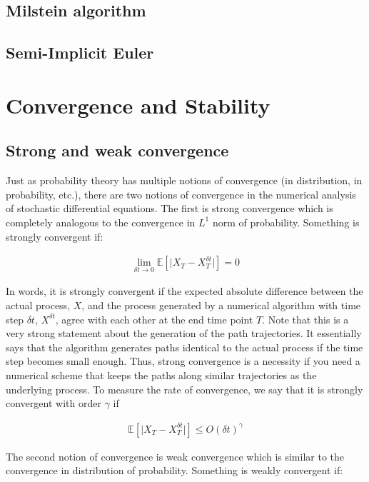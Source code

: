 \documentclass[notitlepage,pra,10pt,aps]{revtex4-2}
\begin{document}
\subsection{Milstein algorithm}

\subsection{Semi-Implicit Euler}

\section{Convergence and Stability}
\subsection{Strong and weak convergence}

Just as probability theory has multiple notions of convergence (in distribution, in probability, etc.), there are two notions of convergence in the numerical analysis of stochastic differential equations. The first is strong convergence which is completely analogous to the convergence in $L^1$ norm of probability. Something is strongly convergent if:

\begin{gather*}
  \lim_{\delta t \rightarrow 0} \mathbb{E} \left[ \lvert X_T - X_T^{\delta t} \rvert \right] = 0
\end{gather*}

In words, it is strongly convergent if the expected absolute difference between the actual process, $X$, and the process generated by a numerical algorithm with time step $\delta t$, $X^{\delta t}$,  agree with each other at the end time point $T$. Note that this is a very strong statement about the generation of the path trajectories. It essentially says that the algorithm generates paths identical to the actual process if the time step becomes small enough. Thus, strong convergence is a necessity if you need a numerical scheme that keeps the paths along similar trajectories as the underlying process. To measure the rate of convergence, we say that it is strongly convergent with order $\gamma$ if

\begin{gather*}
  \mathbb{E} \left[ \lvert X_T - X_T^{\delta t} \rvert \right] \leq O(\delta t)^\gamma
\end{gather*}

The second notion of convergence is weak convergence which is similar to the convergence in distribution of probability. Something is weakly convergent if:
\end{document}
